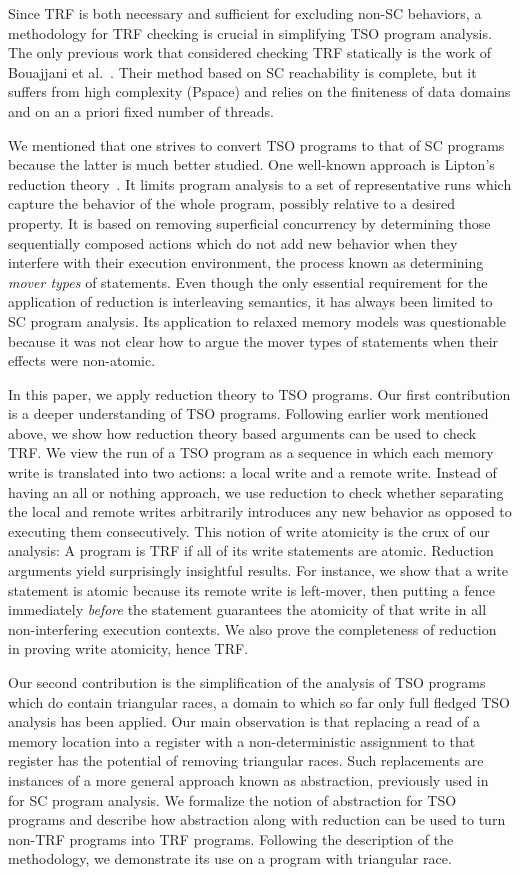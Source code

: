 \documentclass[preprint,9pt]{sigplanconf}
\begin{document}
Since TRF is both necessary and sufficient for excluding non-SC behaviors, a methodology for TRF checking is crucial in simplifying TSO program analysis.
The only previous work that considered checking TRF statically is the work of Bouajjani et al.~\cite{BDM2013}.
Their method based on SC reachability is complete, but it suffers from high complexity ({\sc\small Pspace}) and relies on the finiteness of data domains and on an a priori fixed number of threads.

We mentioned that one strives to convert TSO programs to that of SC programs because the latter is much better studied.
One well-known approach is Lipton's reduction theory~\cite{Lip1975}.
It limits program analysis to a set of representative runs which capture the behavior of the whole program, possibly relative to a desired property.
It is based on removing superficial concurrency by determining those sequentially composed actions which do not add new behavior when they interfere with their execution environment, the process known as determining {\em mover types} of statements.
Even though the only essential requirement for the application of reduction is interleaving semantics, it has always been limited to SC program analysis.
Its application to relaxed memory models was questionable because it was not clear how to argue the mover types of statements when their effects were non-atomic.

In this paper, we apply reduction theory to TSO programs.
Our first contribution is a deeper understanding of TSO programs.
Following earlier work mentioned above, we show how reduction theory based arguments can be used to check TRF.
We view the run of a TSO program as a sequence in which each memory write is translated into two actions: a local write and a remote write.
Instead of having an all or nothing approach, we use reduction to check whether separating the local and remote writes arbitrarily introduces any new behavior as opposed to executing them consecutively.
This notion of write atomicity is the crux of our analysis:
A program is TRF if all of its write statements are atomic.
Reduction arguments yield surprisingly insightful results.
For instance, we show that a write statement is atomic because its remote write is left-mover, then putting a fence immediately {\em before} the statement guarantees the atomicity of that write in all non-interfering execution contexts.
We also prove the completeness of reduction in proving write atomicity, hence TRF.

Our second contribution is the simplification of the analysis of TSO programs which do contain triangular races, a domain to which so far only full fledged TSO analysis has been applied. 
Our main observation is that replacing a read of a memory location into a register with a non-deterministic assignment to that register has the potential of removing triangular races.
Such replacements are instances of a more general approach known as abstraction, previously used in~\cite{EQT2009} for SC program analysis.
We formalize the notion of abstraction for TSO programs and describe how abstraction along with reduction can be used to turn non-TRF programs into TRF programs.
Following the description of the methodology, we demonstrate its use on a program with triangular race.
\end{document}
